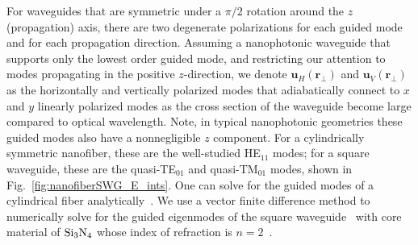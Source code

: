 \documentclass[aps,pra,twocolumn,superscriptaddress]{revtex4-1} %
\newcommand{\mbf}[1]{\mathbf{#1}}
\newcommand{\SWG}{square waveguide\xspace}%
\begin{document}
For waveguides that are symmetric under a $\pi/2$ rotation around the $z$ (propagation) axis, there are two degenerate polarizations for each guided mode and for each propagation direction.  Assuming a nanophotonic waveguide that supports only the lowest order guided mode, and restricting our attention to modes propagating in the positive $z$-direction, we denote $\mbf{u}_H(\mbf{r}_\perp)$ and  $\mbf{u}_V(\mbf{r}_\perp)$ as the horizontally and vertically polarized modes that adiabatically connect to $x$ and $y$ linearly polarized modes as the cross section of the waveguide become large compared to optical wavelength.  Note, in typical nanophotonic geometries these guided modes also have a nonnegligible $z$ component.  For a cylindrically symmetric nanofiber, these are the well-studied HE$_{11}$ modes; for a \SWG, these are the quasi-TE$_{01}$ and quasi-TM$_{01}$ modes, shown in Fig.~\eqref{fig:nanofiberSWG_E_ints}. One can solve for the guided modes of a cylindrical fiber analytically~\cite{Kien2004,Vetsch2010Opticala,Qi2016}. We use a vector finite difference method to numerically solve for the guided eigenmodes of the square waveguide~\cite{Fallahkhair2008} with core material of $ \rm{Si}_3\rm{N}_4 $ whose index of refraction is $ n=2 $~\cite{Lee2013}. 
\end{document}
